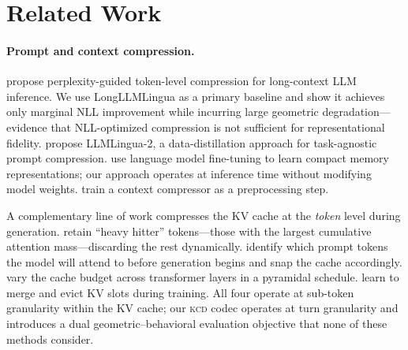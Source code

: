\documentclass[11pt]{article}
\newcommand{\kcd}{\textsc{kcd}}
\begin{document}
\section{Related Work}
\label{sec:related}

\paragraph{Prompt and context compression.}
\citet{jiang-etal-2024-longllmlingua} propose perplexity-guided
token-level compression for long-context LLM inference.
We use LongLLMLingua as a primary baseline and show it achieves
only marginal NLL improvement while incurring large geometric degradation---
evidence that NLL-optimized compression is not sufficient for representational fidelity.
\citet{pan-etal-2024-llmlingua2} propose LLMLingua-2, a data-distillation
approach for task-agnostic prompt compression.
\citet{chevalier-etal-2023-adapting} use language model fine-tuning to learn
compact memory representations; our approach operates at inference time
without modifying model weights.
\citet{he-etal-2025-pretraining} train a context compressor as a preprocessing step.

A complementary line of work compresses the KV cache at the \emph{token} level
during generation.
\citet{zhang-etal-2023-h2o} retain ``heavy hitter'' tokens---those with the
largest cumulative attention mass---discarding the rest dynamically.
\citet{li-etal-2024-snapkv} identify which prompt tokens the model will attend
to before generation begins and snap the cache accordingly.
\citet{cai-etal-2024-pyramidkv} vary the cache budget across transformer layers
in a pyramidal schedule.
\citet{nawrot-etal-2024-dynamic} learn to merge and evict KV slots during training.
All four operate at sub-token granularity within the KV cache;
our \kcd{} codec operates at turn granularity and introduces a dual geometric--behavioral
evaluation objective that none of these methods consider.
\end{document}
